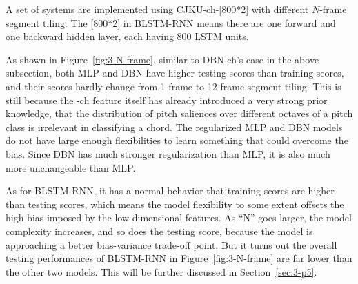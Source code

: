 A set of systems are implemented using CJKU-ch-[800*2] with different $N$-frame segment tiling. The [800*2] in BLSTM-RNN means there are one forward and one backward hidden layer, each having 800 LSTM units.

As shown in Figure~\ref{fig:3-N-frame}, similar to DBN-ch's case in the above subsection, both MLP and DBN have higher testing scores than training scores, and their scores hardly change from 1-frame to 12-frame segment tiling. This is still because the -ch feature itself has already introduced a very strong prior knowledge, that the distribution of pitch saliences over different octaves of a pitch class is irrelevant in classifying a chord. The regularized MLP and DBN models do not have large enough flexibilities to learn something that could overcome the bias. Since DBN has much stronger regularization than MLP, it is also much more unchangeable than MLP.

As for BLSTM-RNN, it has a normal behavior that training scores are higher than testing scores, which means the model flexibility to some extent offsets the high bias imposed by the low dimensional features. As ``N'' goes larger, the model complexity increases, and so does the testing score, because the model is approaching a better bias-variance trade-off point. But it turns out the overall testing performances of BLSTM-RNN in Figure~\ref{fig:3-N-frame} are far lower than the other two models. This will be further discussed in Section~\ref{sec:3-p5}.

